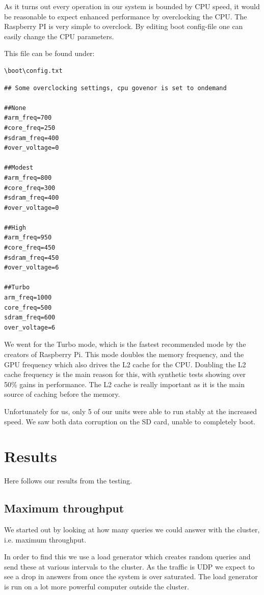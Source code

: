 As it turns out every operation in our system is bounded by CPU speed, it would be reasonable to expect enhanced performance by overclocking the CPU.
The Raspberry PI is very simple to overclock. By editing boot config-file one can easily change the CPU parameters.

This file can be found under:

\begin{lstlisting}
\boot\config.txt
\end{lstlisting}

\begin{lstlisting}
## Some overclocking settings, cpu govenor is set to ondemand

##None
#arm_freq=700
#core_freq=250
#sdram_freq=400
#over_voltage=0

##Modest
#arm_freq=800
#core_freq=300
#sdram_freq=400
#over_voltage=0

##High
#arm_freq=950
#core_freq=450
#sdram_freq=450
#over_voltage=6

##Turbo
arm_freq=1000
core_freq=500
sdram_freq=600
over_voltage=6
\end{lstlisting}

We went for the Turbo mode, which is the fastest recommended mode by the creators of Raspberry Pi.
This mode doubles the memory frequency, and the GPU frequency which also drives the L2 cache for the CPU.
Doubling the L2 cache frequency is the main reason for this, with synthetic tests showing over 50\% gains in performance\cite{overclock}.
The L2 cache is really important as it is the main source of caching before the memory.

Unfortunately for us, only 5 of our units were able to run stably at the increased speed.
We saw both data corruption on the SD card, unable to completely boot.

\clearpage
\section{Results}
\label{sec:experiments}

Here follows our results from the testing.

\subsection{Maximum throughput}
We started out by looking at how many queries we could answer with the cluster, i.e. maximum throughput.

In order to find this we use a load generator which creates random queries and send these at various intervals to the cluster. As the traffic is UDP we expect to see a drop in answers from once the system is over saturated. The load generator is run on a lot more powerful computer outside the cluster.

